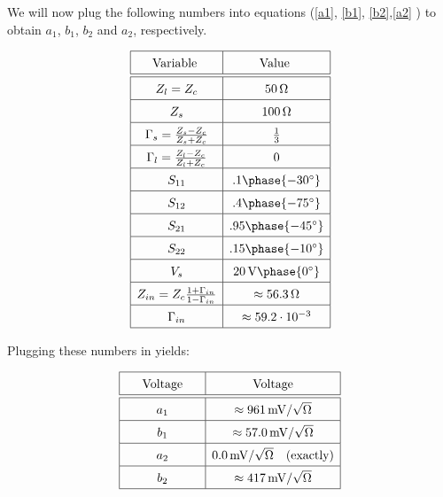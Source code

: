 We will now plug the following numbers into equations (\ref{a1}, \ref{b1}, \ref{b2},\ref{a2}
) to obtain $a_1$, $b_1$, $b_2$ and $a_2$, respectively.

\[
        \def\arraystretch{1.5}
        \begin{array}{|c|c|}
            \hline  \text{\quad Variable \quad}  & \text{\quad Value \quad } \\
            \hline \hline Z_{l} = Z_c & \SI{50}{\ohm} \\
            \hline Z_{s} & \SI{100}{\ohm} \\
            \hline \Gamma_s = \frac{Z_s - Z_c}{Z_s+Z_c} & \frac{1}{3} \\
            \hline \Gamma_l = \frac{Z_l-Z_c}{Z_l+Z_c}  & 0 \\
            \hline S_{11} & .1 \phase{-30 \degree} \\
            \hline S_{12} & .4 \phase{-75 \degree} \\
            \hline S_{21} & .95 \phase{- 45 \degree} \\
            \hline S_{22} & .15 \phase{-10 \degree} \\
            \hline V_{s} & \SI{20}{\volt}\phase{0 \degree} \\
            \hline Z_{in} = Z_c \frac{1+\Gamma_{in}}{1 - \Gamma_{in}} &  \approx
            \SI{56.3}{\ohm} \\
            \hline \Gamma_{in} & \approx 59.2\cdot 10^{-3} \\ \hline
        \end{array}
\]

Plugging these numbers in yields:

\[
        \def\arraystretch{1.5}
        \begin{array}{|c|c|}
            \hline \text{ \quad Voltage \quad } & \text{ \quad Voltage \quad }
            \\
            \hline \hline a_1 & \approx \SI{961}{\milli\volt\per\sqrt{\ohm}} \\
            \hline b_1 & \approx \SI{57.0}{\milli\volt\per\sqrt{\ohm}} \\
            \hline a_2 & \SI{0.0}{\milli\volt\per\sqrt{\ohm}} \text{\quad
        (exactly)} \\
            \hline b_2 & \approx \SI{417}{\milli\volt\per\sqrt{\ohm}} \\ \hline
        \end{array}
\]
